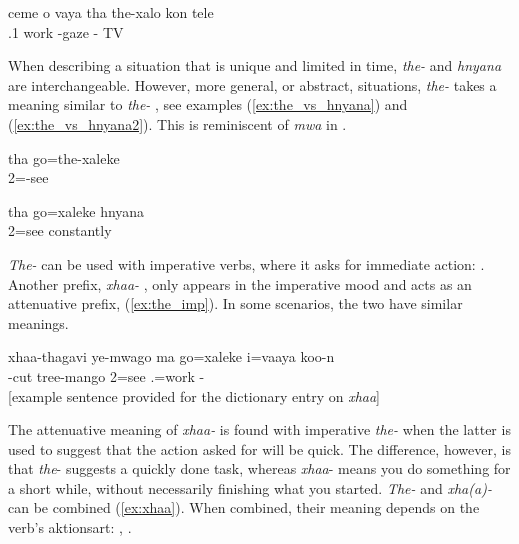\ea\label{ex:constant_the}
\gll ceme o vaya tha the-xalo kon tele\\
 .1  work  -gaze - TV\\
\glt {}
\z

\begin{sloppypar}
When describing a situation that is unique and limited in time, \textit{the-} and \textit{hnyana} are interchangeable. However, more general, or abstract, situations, \textit{the-}  takes a meaning similar to \textit{the-} , see examples (\ref{ex:the_vs_hnyana}) and (\ref{ex:the_vs_hnyana2}). This is reminiscent of \textit{mwa}  in .
\end{sloppypar}

	\ea \label{ex:the_vs_hnyana}
	\gll tha go=the-xaleke\\
		  2=-see\\
	\glt {}
	\z 
		
	\ea \label{ex:the_vs_hnyana2}
		\gll tha go=xaleke hnyana\\
	  2=see constantly\\
	\glt {}
		\z



\textit{The-} can be used with imperative verbs, where it asks for immediate action: . Another prefix, \textit{xhaa-} , only appears in the imperative mood and acts as an attenuative prefix,  (\ref{ex:the_imp}). In some scenarios, the two have similar meanings.%

\ea \label{ex:the_imp}\gll xhaa-thagavi ye-mwago ma go=xaleke i=vaaya koo-n\\
 -cut tree-mango  2=see .=work -\\
\glt {} {[example sentence provided for the dictionary entry on \textit{xhaa}]}
\z
 
The attenuative meaning of \textit{xhaa-} is found with imperative \textit{the-} when the latter is used to suggest that the action asked for will be quick. The difference, however, is that \textit{the}- suggests a quickly done task, whereas \textit{xhaa}- means you do something for a short while, without necessarily finishing what you started. \textit{The-} and \textit{xha(a)-} can be combined (\ref{ex:xhaa}). When combined, their meaning depends on the verb's aktionsart: , .

